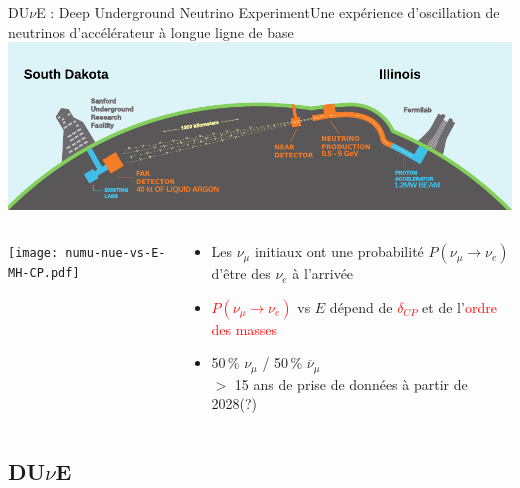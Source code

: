    \begin{frame}{DU$\nu$E : Deep Underground Neutrino Experiment}{Une expérience d'oscillation de neutrinos d'accélérateur à longue ligne de base}
        \includegraphics[width=\textwidth]{./pictures/dune.pdf}\\
        \begin{scriptsize}
        \vspace{0.4cm}
        \begin{columns}
            \begin{column}{0.75\textwidth}
                \texttt{[image: numu-nue-vs-E-MH-CP.pdf]}
            \end{column}
            \hspace{-0.5cm}
            \begin{column}{0.35\textwidth}
                 \begin{itemize}
                     \item Les $\nu_{\mu}$ initiaux ont une probabilité $P(\nu_{\mu}\to\nu_e)$ d'être des $\nu_e$ à l'arrivée
                     \item \textcolor{red}{$P(\nu_{\mu}\to\nu_e)$} vs $E$ dépend de \textcolor{red}{$\delta_{CP}$} et de l'\textcolor{red}{ordre des masses}
                     \item 50\,\% $\nu_{\mu}$ / 50\,\% $\overline{\nu}_{\mu}$ \\ $>$ 15 ans de prise de données à partir de 2028(?)
                 \end{itemize}
            \end{column}
        \end{columns}
        \end{scriptsize}
    \end{frame}
    
    \subsection{DU$\nu$E}
    
